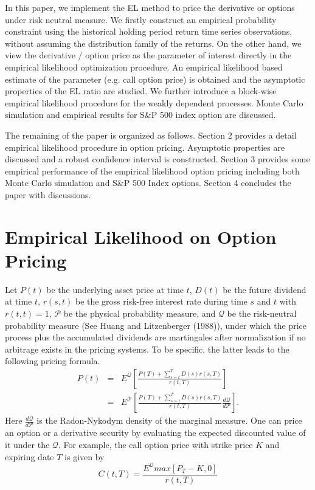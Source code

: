 \documentclass[oneside,english]{amsbook}
\numberwithin{section}{chapter}
\numberwithin{equation}{section}
\numberwithin{figure}{section}
\theoremstyle{plain}
\theoremstyle{plain}
\theoremstyle{definition}
\theoremstyle{plain}
\theoremstyle{plain}
\theoremstyle{remark}
\theoremstyle{definition}
\theoremstyle{definition}
\begin{document}
In this paper, we implement the EL method to price the derivative or options under risk neutral measure. We firstly construct an empirical probability constraint using the historical holding period return time series observations, without assuming the distribution family of the returns. On the other hand, we view the derivative / option price as the parameter of interest directly in the empirical likelihood optimization procedure. An empirical likelihood based estimate of the parameter (e.g. call option price) is obtained and the asymptotic properties of the EL ratio are studied. We further introduce a block-wise empirical likelihood procedure for the weakly dependent processes. Monte Carlo simulation and empirical results for S\&P 500 index option are discussed.     

The remaining of the paper is organized as follows. Section 2 provides a detail empirical likelihood procedure in option pricing. Asymptotic properties are discussed and a robust confidence interval is constructed. Section 3 provides some empirical performance of the empirical likelihood option pricing including both Monte Carlo simulation and S\&P 500 Index options. Section 4 concludes the paper with discussions.

 
\section{Empirical Likelihood on Option Pricing}
Let $P(t)$ be the underlying asset price at time $t$, $D(t)$ be the future dividend at time $t$, $r(s,t)$ be the gross risk-free interest rate during time $s$ and $t$ with $r(t,t)=1$,  $\mathcal{P}$ be the physical probability measure, and $\mathcal{Q}$ be the risk-neutral probability measure (See Huang and Litzenberger  (1988)), under which the price process plus the accumulated dividends are martingales after normalization if no arbitrage exists in the pricing systems. To be specific, the latter leads to the following pricing formula.
\begin{eqnarray}
P(t)&=&E^{\mathcal{Q}}[\frac{P(T)+\sum_{s=t}^{T}D(s)r(s,T)}{r(t,T)}]\label{eqn:410}\\
&=&E^{\mathcal{P}}[\frac{P(T)+\sum_{s=t}^{T}D(s)r(s,T)}{r(t,T)}\frac{d\mathcal{Q}}{d\mathcal{P}}].\nonumber
\end{eqnarray}
Here $\frac{d\mathcal{Q}}{d\mathcal{P}}$ is the Radon-Nykodym density of the marginal measure. One can price an option or a derivative security by evaluating the expected discounted value of it under the $\mathcal{Q}$. For example, the call option price with strike price $K$ and expiring date $T$ is given by
\begin{equation}\label{eqn:4102}
C(t,T)=\frac{E ^{\mathcal{Q}}  max[P_T - K,0]   }{r(t,T)} 
\end{equation} 
\end{document}
